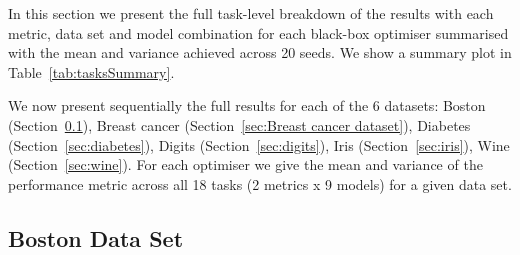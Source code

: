 \documentclass[jair,twoside,11pt,theapa]{article}
\theoremstyle{definition}
\begin{document}
In this section we present the full task-level breakdown of the results with each metric, data set and model combination for each black-box optimiser summarised with the mean and variance achieved across 20 seeds. We show a summary plot in Table~\ref{tab:tasksSummary}.

\begin{table}[h!]
\centering
\caption{Number of tasks for which each optimiser performed best.}
\label{tab:tasksSummary}
\end{table}

We now present sequentially the full results for each of the 6 datasets: Boston (Section~\ref{sec:boston}), Breast cancer (Section~\ref{sec:Breast cancer dataset}), Diabetes (Section~\ref{sec:diabetes}), Digits (Section~\ref{sec:digits}), Iris (Section~\ref{sec:iris}), Wine (Section~\ref{sec:wine}). For each optimiser we give the mean and variance of the performance metric across all 18 tasks (2 metrics x 9 models) for a given data set.

\newpage

\subsection{Boston Data Set}\label{sec:boston}
\end{document}
